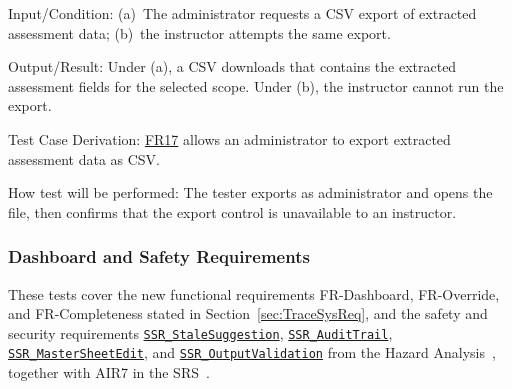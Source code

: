 \documentclass[12pt, titlepage]{article}
\newcommand{\halink}[1]{\href{https://github.com/shivyam/cas-course-optimization/blob/main/pdfs/HazardAnalysis/HazardAnalysis.pdf}{#1}}
\newcommand{\frlink}[1]{\href{https://github.com/shivyam/cas-course-optimization/blob/main/pdfs/SRS-IEEE/SRS.pdf}{FR#1}}
\begin{document}
\begin{enumerate}
Input/Condition: (a)~The administrator requests a CSV export of extracted assessment data; (b)~the instructor attempts the same export.

Output/Result: Under (a), a CSV downloads that contains the extracted assessment fields for the selected scope. Under (b), the instructor cannot run the export.

Test Case Derivation: \frlink{17} allows an administrator to export extracted assessment data as CSV.

How test will be performed: The tester exports as administrator and opens the file, then confirms that the export control is unavailable to an instructor.

\end{enumerate}

\subsubsection{Dashboard and Safety Requirements}

These tests cover the new functional requirements FR-Dashboard, FR-Override, and FR-Completeness stated in Section~\ref{sec:TraceSysReq}, and the safety and security requirements \halink{\texttt{SSR\_StaleSuggestion}}, \halink{\texttt{SSR\_AuditTrail}}, \halink{\texttt{SSR\_MasterSheetEdit}}, and \halink{\texttt{SSR\_OutputValidation}} from the Hazard Analysis~\citep{TeamBVSH2026HA}, together with AIR7 in the SRS~\citep{TeamBVSH2026SRS}.
\end{document}
